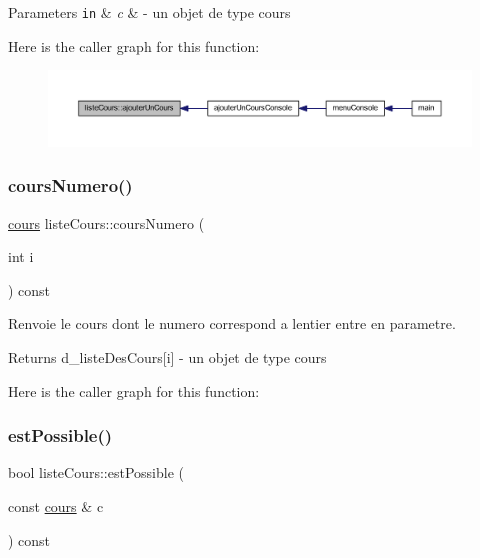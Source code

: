 \begin{DoxyParams}[1]{Parameters}
\mbox{\tt in}  & {\em c} & -\/ un objet de type cours \\
\hline
\end{DoxyParams}
Here is the caller graph for this function\+:\nopagebreak
\begin{figure}[H]
\begin{center}
\leavevmode
\includegraphics[width=350pt]{classliste_cours_aacc38305cfea76d8cc77d710d144ce8b_icgraph}
\end{center}
\end{figure}
\hypertarget{classliste_cours_ac00615f15632669bf44424e960c95edd}{}\label{classliste_cours_ac00615f15632669bf44424e960c95edd} 
\subsubsection{\texorpdfstring{cours\+Numero()}{coursNumero()}}
{\footnotesize\ttfamily \hyperlink{classcours}{cours} liste\+Cours\+::cours\+Numero (\begin{DoxyParamCaption}\item[{int}]{i }\end{DoxyParamCaption}) const}



Renvoie le cours dont le numero correspond a l\textquotesingle{}entier entre en parametre. 

\begin{DoxyReturn}{Returns}
d\+\_\+liste\+Des\+Cours\mbox{[}i\mbox{]} -\/ un objet de type cours 
\end{DoxyReturn}
Here is the caller graph for this function\+:
\hypertarget{classliste_cours_ab66777592d4693d8db47e756dfe61878}{}\label{classliste_cours_ab66777592d4693d8db47e756dfe61878} 
\subsubsection{\texorpdfstring{est\+Possible()}{estPossible()}}
{\footnotesize\ttfamily bool liste\+Cours\+::est\+Possible (\begin{DoxyParamCaption}\item[{const \hyperlink{classcours}{cours} \&}]{c }\end{DoxyParamCaption}) const}



